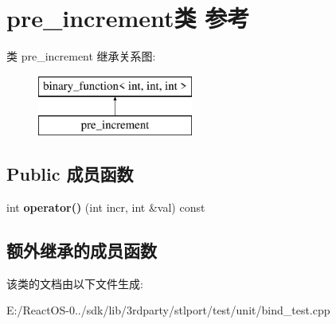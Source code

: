 \hypertarget{classpre__increment}{}\section{pre\+\_\+increment类 参考}
\label{classpre__increment}
类 pre\+\_\+increment 继承关系图\+:\begin{figure}[H]
\begin{center}
\leavevmode
\includegraphics[height=2.000000cm]{classpre__increment}
\end{center}
\end{figure}
\subsection*{Public 成员函数}
\begin{DoxyCompactItemize}
\item 
\mbox{\label{classpre__increment_a062387b70dc8f9994e55872b3e9ddedb}} 
int {\bfseries operator()} (int incr, int \&val) const
\end{DoxyCompactItemize}
\subsection*{额外继承的成员函数}


该类的文档由以下文件生成\+:\begin{DoxyCompactItemize}
\item 
E\+:/\+React\+O\+S-\/0../sdk/lib/3rdparty/stlport/test/unit/bind\+\_\+test.\+cpp\end{DoxyCompactItemize}
